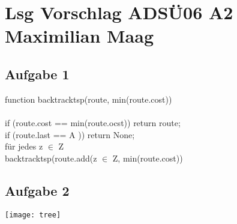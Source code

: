 \documentclass{article}
\begin{document}
	\section*{Lsg Vorschlag ADSÜ06 A2 Maximilian Maag}
	\subsection*{Aufgabe 1}
	function backtracktsp(route, min(route.cost)) \\
	\\
	if (route.cost == min(route.ocst)) return route; \\
	if (route.last == A )) return None; \\
	für jedes z $\in$ Z \\
	backtracktsp(route.add(z $\in$ Z, min(route.cost)) \\
	
	\subsection*{Aufgabe 2}
	\texttt{[image: tree]}
\end{document}
